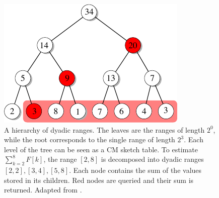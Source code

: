 \begin{figure}[h]
  \centering
  \includegraphics[width=0.55\linewidth]{images/dyadic-ranges}
  \caption{A hierarchy of dyadic ranges. The leaves are the ranges of length $2^0$, while the root corresponds to the single range of length $2^3$. Each level of the tree can be seen as a CM sketch table. To estimate $\sum_{k=2}^8F[k]$, the range $[2,8]$ is decomposed into dyadic ranges $[2,2], [3,4], [5,8]$. Each node contains the sum of the values stored in its children. Red nodes are queried and their sum is returned. Adapted from \cite{Cormode11}.}
    \label{figure:dyadic-ranges}
\end{figure}
